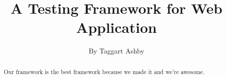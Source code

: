 \documentclass[11pt]{article}
\begin{document}

\title{\vfill A Testing Framework for Web Application} %
\author{
By Taggart Ashby \vspace{10pt} \\
}

\maketitle

\vfill  %

\begin{abstract}
Our framework is the best framework because we made it and we're awesome.
\end{abstract}

\thispagestyle{empty} %
\newpage

\end{document}
